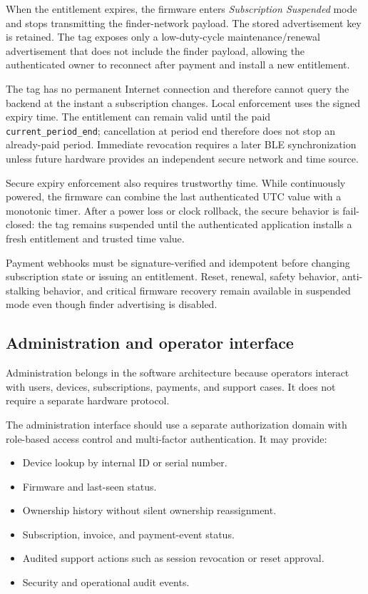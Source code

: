 \documentclass[12pt,a4paper]{article}
\newcommand{\code}[1]{\texttt{#1}}
\begin{document}
When the entitlement expires, the firmware enters \textit{Subscription
Suspended} mode and stops transmitting the finder-network payload. The stored
advertisement key is retained. The tag exposes only a low-duty-cycle
maintenance/renewal advertisement that does not include the finder payload,
allowing the authenticated owner to reconnect after payment and install a new
entitlement.

The tag has no permanent Internet connection and therefore cannot query the
backend at the instant a subscription changes. Local enforcement uses the
signed expiry time. The entitlement can remain valid until the paid
\code{current\_period\_end}; cancellation at period end therefore does not stop
an already-paid period. Immediate revocation requires a later BLE
synchronization unless future hardware provides an independent secure network
and time source.

Secure expiry enforcement also requires trustworthy time. While continuously
powered, the firmware can combine the last authenticated UTC value with a
monotonic timer. After a power loss or clock rollback, the secure behavior is
fail-closed: the tag remains suspended until the authenticated application
installs a fresh entitlement and trusted time value.

Payment webhooks must be signature-verified and idempotent before changing
subscription state or issuing an entitlement. Reset, renewal, safety behavior,
anti-stalking behavior, and critical firmware recovery remain available in
suspended mode even though finder advertising is disabled.

\subsection{Administration and operator interface}

Administration belongs in the software architecture because operators interact
with users, devices, subscriptions, payments, and support cases. It does not
require a separate hardware protocol.

The administration interface should use a separate authorization domain with
role-based access control and multi-factor authentication. It may provide:

\begin{itemize}
    \item Device lookup by internal ID or serial number.
    \item Firmware and last-seen status.
    \item Ownership history without silent ownership reassignment.
    \item Subscription, invoice, and payment-event status.
    \item Audited support actions such as session revocation or reset approval.
    \item Security and operational audit events.
\end{itemize}
\end{document}
